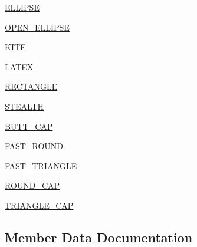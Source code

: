 \begin{DoxyCompactItemize}
\item 
\hyperlink{enumcom_1_1aarrelaakso_1_1drawl_1_1_arrowhead_1_1_type_a7243ba4efe6f7013ec9ec3e66f581fd8}{E\+L\+L\+I\+P\+SE}
\item 
\hyperlink{enumcom_1_1aarrelaakso_1_1drawl_1_1_arrowhead_1_1_type_a2a469be7b814da9b632d56e431565b37}{O\+P\+E\+N\+\_\+\+E\+L\+L\+I\+P\+SE}
\item 
\hyperlink{enumcom_1_1aarrelaakso_1_1drawl_1_1_arrowhead_1_1_type_a3d093a6479d611b91fd4802da7d4afc3}{K\+I\+TE}
\item 
\hyperlink{enumcom_1_1aarrelaakso_1_1drawl_1_1_arrowhead_1_1_type_adca44209b56fad76f36cc6e8ad546c68}{L\+A\+T\+EX}
\item 
\hyperlink{enumcom_1_1aarrelaakso_1_1drawl_1_1_arrowhead_1_1_type_a8380490ae211a6681e81fd6835388edf}{R\+E\+C\+T\+A\+N\+G\+LE}
\item 
\hyperlink{enumcom_1_1aarrelaakso_1_1drawl_1_1_arrowhead_1_1_type_a300d91ce1b8770d4f39c39479528a9d5}{S\+T\+E\+A\+L\+TH}
\item 
\hyperlink{enumcom_1_1aarrelaakso_1_1drawl_1_1_arrowhead_1_1_type_a11a1867d678f006db71e1a288df31079}{B\+U\+T\+T\+\_\+\+C\+AP}
\item 
\hyperlink{enumcom_1_1aarrelaakso_1_1drawl_1_1_arrowhead_1_1_type_abc18d5d09da2af023716c6a170f19dd7}{F\+A\+S\+T\+\_\+\+R\+O\+U\+ND}
\item 
\hyperlink{enumcom_1_1aarrelaakso_1_1drawl_1_1_arrowhead_1_1_type_ab17746e47ec7e8ee2177e11bcee3201a}{F\+A\+S\+T\+\_\+\+T\+R\+I\+A\+N\+G\+LE}
\item 
\hyperlink{enumcom_1_1aarrelaakso_1_1drawl_1_1_arrowhead_1_1_type_ae9b576cd80e0be2d2c1655d8939b2064}{R\+O\+U\+N\+D\+\_\+\+C\+AP}
\item 
\hyperlink{enumcom_1_1aarrelaakso_1_1drawl_1_1_arrowhead_1_1_type_a2b5a534d002a522553112995369db66e}{T\+R\+I\+A\+N\+G\+L\+E\+\_\+\+C\+AP}
\end{DoxyCompactItemize}


\subsection{Member Data Documentation}
\mbox{\label{enumcom_1_1aarrelaakso_1_1drawl_1_1_arrowhead_1_1_type_ab1a7fc7ccf7d089ac3b9b542d5658a7d}} 
